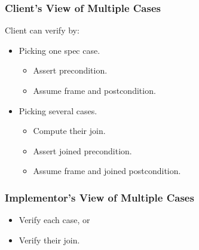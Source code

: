 \begin{frame}
\frametitle{Client's View of Multiple Cases}

Client can verify by:
\begin{itemize}
\item
Picking one spec case.
\begin{itemize}
\item
Assert precondition.

\item
Assume frame and postcondition.
\end{itemize}

\item
Picking several cases.
\begin{itemize}
\item
Compute their join.

\item
Assert joined precondition.

\item
Assume frame and joined postcondition.
\end{itemize}
\end{itemize}
\end{frame}

\begin{frame}
\frametitle{Implementor's View of Multiple Cases}

\begin{itemize}
\item
Verify each case, or

\item
Verify their join.
\end{itemize}
\end{frame}


